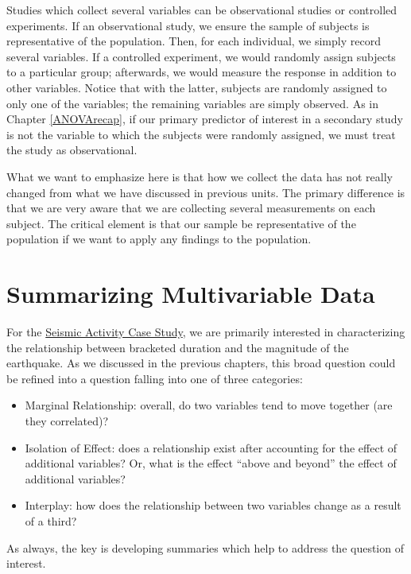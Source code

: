 \documentclass[]{book}
\providecommand{\tightlist}{%
  \setlength{\itemsep}{0pt}\setlength{\parskip}{0pt}}
\theoremstyle{definition}
\theoremstyle{definition}
\theoremstyle{definition}
\theoremstyle{remark}
\begin{document}
Studies which collect several variables can be observational studies or
controlled experiments. If an observational study, we ensure the sample
of subjects is representative of the population. Then, for each
individual, we simply record several variables. If a controlled
experiment, we would randomly assign subjects to a particular group;
afterwards, we would measure the response in addition to other
variables. Notice that with the latter, subjects are randomly assigned
to only one of the variables; the remaining variables are simply
observed. As in Chapter \ref{ANOVArecap}, if our primary predictor of
interest in a secondary study is not the variable to which the subjects
were randomly assigned, we must treat the study as observational.

What we want to emphasize here is that how we collect the data has not
really changed from what we have discussed in previous units. The
primary difference is that we are very aware that we are collecting
several measurements on each subject. The critical element is that our
sample be representative of the population if we want to apply any
findings to the population.

\chapter{Summarizing Multivariable Data}\label{Regsummaries}

For the \protect\hyperlink{CaseGreece}{Seismic Activity Case Study}, we
are primarily interested in characterizing the relationship between
bracketed duration and the magnitude of the earthquake. As we discussed
in the previous chapters, this broad question could be refined into a
question falling into one of three categories:

\begin{itemize}
\tightlist
\item
  Marginal Relationship: overall, do two variables tend to move together
  (are they correlated)?
\item
  Isolation of Effect: does a relationship exist after accounting for
  the effect of additional variables? Or, what is the effect ``above and
  beyond'' the effect of additional variables?
\item
  Interplay: how does the relationship between two variables change as a
  result of a third?
\end{itemize}

As always, the key is developing summaries which help to address the
question of interest.
\end{document}
